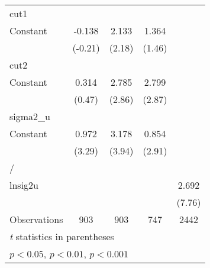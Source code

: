 {\begin{longtable}{l*{4}{c}}
\midrule
cut1            &                  &                  &                  &                  \\
Constant        &   -0.138         &    2.133\sym{*}  &    1.364         &                  \\
                &  (-0.21)         &   (2.18)         &   (1.46)         &                  \\
\midrule
cut2            &                  &                  &                  &                  \\
Constant        &    0.314         &    2.785\sym{**} &    2.799\sym{**} &                  \\
                &   (0.47)         &   (2.86)         &   (2.87)         &                  \\
\midrule
sigma2\_u        &                  &                  &                  &                  \\
Constant        &    0.972\sym{***}&    3.178\sym{***}&    0.854\sym{**} &                  \\
                &   (3.29)         &   (3.94)         &   (2.91)         &                  \\
\midrule
/               &                  &                  &                  &                  \\
lnsig2u         &                  &                  &                  &    2.692\sym{***}\\
                &                  &                  &                  &   (7.76)         \\
\midrule
Observations    &      903         &      903         &      747         &     2442         \\
\bottomrule
\multicolumn{5}{l}{\footnotesize \textit{t} statistics in parentheses}\\
\multicolumn{5}{l}{\footnotesize \sym{*} \(p<0.05\), \sym{**} \(p<0.01\), \sym{***} \(p<0.001\)}\\
\end{longtable}
}
